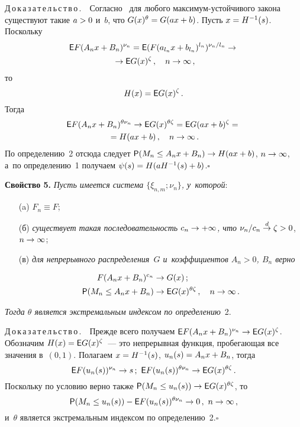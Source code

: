 \begin{multicols}{2}
\noindent
Д\,о\,к\,а\,з\,а\,т\,е\,л\,ь\,с\,т\,в\,о\,.\ \
Согласно~\cite[следствие 1.3.2]{LLR} для любого мак\-си\-мум-устой\-чи\-во\-го
закона существуют такие
$a\hm>0$ и~$b$, что $G(x)^\theta\hm=G(ax\hm+b)$. Пусть $x\hm=H^{-1}(s)$.
Поскольку
\begin{multline*}
{\sf E}F(A_nx+B_n)^{\nu_n}={\sf E}(F(a_{l_n}x+b_{l_n})^{l_n})^{\nu_n/l_n}\to{}\\
{}\to
{\sf E}G(x)^\zeta\,,\quad n\to\infty\,,
\end{multline*}
то 
$$
H(x)={\sf E}G(x)^\zeta\,.
$$
Тогда
\begin{multline*}
{\sf E}F(A_nx+B_n)^{\theta\nu_n}\to
{\sf E}G(x)^{\theta\zeta}={\sf E}G(ax+b)^\zeta={}\\
{}=
H(ax+b)\,,\quad n\to\infty\,.
\end{multline*}
По определению~2 отсюда следует ${\sf P}(M_n\le A_nx\hm+B_n)\hm\to
H(ax\hm+b)$, $n\hm\to\infty$, а~по определению~1 получаем
$\psi(s)\hm=H(aH^{-1}(s)\hm+b)$.\hfill$\square$

\smallskip

\noindent
\textbf{Свойство 5.} \textit{Пусть имеется система $\{\xi_{n,m};\nu_n\}$,
у~которой}:
\begin{enumerate}
\item[(a)] $F_n\equiv F$;
\item[(б)] \textit{существует такая последовательность $c_n\hm\to +\infty$,
что} $\nu_n/c_n\stackrel{d}{\to}\zeta\hm>0$, $n\hm\to\infty$;

\item[(в)] \textit{для непрерывного распределения~$G$
и~коэффициентов $A_n>0$, $B_n$ верно}

\vspace*{-9pt}

\noindent
\begin{align*}
F(A_nx+B_n)^{c_n}&\to G(x)\,;\\
{\sf P}(M_n\le A_nx+B_n)&\to {\sf E}G(x)^{\theta\zeta}\,,\quad n\to\infty\,.
\end{align*}
\end{enumerate}

\textit{Тогда $\theta$ является экстремальным индексом по определению}~2.



\noindent
Д\,о\,к\,а\,з\,а\,т\,е\,л\,ь\,с\,т\,в\,о\,.\ \
Прежде всего получаем ${\sf E}F(A_nx\hm+B_n)^{\nu_n}\hm\to {\sf E}G(x)^\zeta$.
Обозначим
$H(x)\hm={\sf E}G(x)^\zeta$~--- это непрерывная функция, про\-бе\-га\-ющая все значения
в~$(0,1)$. Полагаем $x\hm=H^{-1}(s)$, $u_n(s)\hm=A_nx\hm+B_n$, тогда
\begin{equation*}
{\sf E}F(u_n(s))^{\nu_n}\to s\,;\ 
{\sf E}F(u_n(s))^{\theta\nu_n}\to {\sf E}G(x)^{\theta\zeta}\,.
\end{equation*}
Поскольку по условию
верно также ${\sf P}(M_n\hm\le u_n(s))\hm\to {\sf E}G(x)^{\theta\zeta}$, то
$$
{\sf P}(M_n\le u_n(s))-{\sf E}F(u_n(s))^{\theta\nu_n}\to 0\,,
\ n\to\infty\,,
$$
 и~$\theta$ является экстремальным индексом по
определению~2.\hfill$\square$



\end{multicols}
